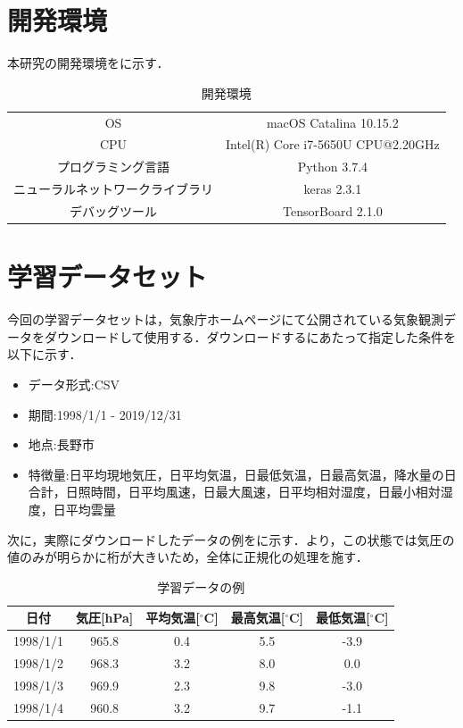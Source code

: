 \documentclass{eithesis}
\begin{document}
  \section{開発環境}
    本研究の開発環境をに示す．
    \begin{table}[htbp]
      \centering
      \caption{開発環境}
      \label{tab_environment}
      \begin{tabular}{c|c}
        \toprule
        OS & macOS Catalina 10.15.2 \\
        CPU & Intel(R) Core i7-5650U CPU@2.20GHz \\
        プログラミング言語 & Python 3.7.4 \\
        ニューラルネットワークライブラリ & keras 2.3.1 \\
        デバッグツール & TensorBoard 2.1.0 \\
        \bottomrule
      \end{tabular}
    \end{table}

  \section{学習データセット}
    今回の学習データセットは，気象庁ホームページ\cite{data}にて公開されている気象観測データをダウンロードして使用する．ダウンロードするにあたって指定した条件を以下に示す．
    \begin{itemize}
      \item データ形式:CSV
      \item 期間:1998/1/1 - 2019/12/31
      \item 地点:長野市
      \item 特徴量:日平均現地気圧，日平均気温，日最低気温，日最高気温，降水量の日合計，日照時間，日平均風速，日最大風速，日平均相対湿度，日最小相対湿度，日平均雲量
    \end{itemize}

    次に，実際にダウンロードしたデータの例をに示す．より，この状態では気圧の値のみが明らかに桁が大きいため，全体に正規化の処理を施す．
    \begin{table}[htbp]
      \centering
      \caption{学習データの例}
      \label{tab_sample}
      \begin{tabular}[htbp]{c|c|c|c|c}
        日付 & 気圧[hPa] & 平均気温[$^\circ$C] & 最高気温[$^\circ$C] & 最低気温[$^\circ$C] \\ \hline
        1998/1/1 & 965.8 & 0.4 & 5.5 & -3.9 \\
        1998/1/2 & 968.3 & 3.2 & 8.0 &  0.0 \\
        1998/1/3 & 969.9 & 2.3 & 9.8 & -3.0 \\
        1998/1/4 & 960.8 & 3.2 & 9.7 & -1.1 \\
      \end{tabular}
    \end{table}
\end{document}
